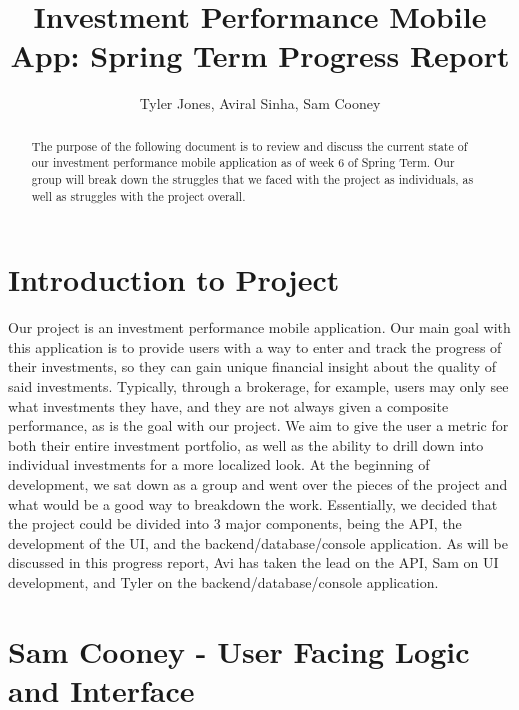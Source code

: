 \documentclass[letterpaper,10pt,titlepage,journal,compsoc,draftclsnofoot,onecolumn]{IEEEtran}
\title{Investment Performance Mobile App: Spring Term Progress Report}
\author{Tyler Jones, Aviral Sinha, Sam Cooney}
\newcommand\tab[1][1cm]{\hspace*{#1}}
\begin{document}
\begin{titlingpage}
    \maketitle
	\centering{}
    \begin{abstract}
        
     The purpose of the following document is to review and discuss the current state of our investment performance mobile application as of week 6 of Spring Term. Our group will break down the struggles that we faced with the project as individuals, as well as struggles with the project overall.
        
    \end{abstract}
\end{titlingpage}

\newpage

\tableofcontents{}

\newpage

\section{Introduction to Project}

\tab Our project is an investment performance mobile application. Our main goal with this application is to provide users with a way to enter and track the progress of their investments, so they can gain unique financial insight about the quality of said investments. Typically, through a brokerage, for example, users may only see what investments they have, and they are not always given a composite performance, as is the goal with our project. We aim to give the user a metric for both their entire investment portfolio, as well as the ability to drill down into individual investments for a more localized look. At the beginning of development, we sat down as a group and went over the pieces of the project and what would be a good way to breakdown the work. Essentially, we decided that the project could be divided into 3 major components, being the API, the development of the UI, and the backend/database/console application. As will be discussed in this progress report, Avi has taken the lead on the API, Sam on UI development, and Tyler on the backend/database/console application.

\section{Sam Cooney - User Facing Logic and Interface}
\end{document}
